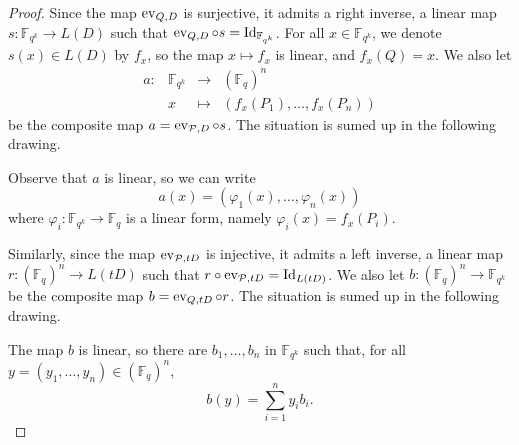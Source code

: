 \documentclass[11pt]{article}
\begin{document}
\begin{proof}
  Since the map $\operatorname{ev}_{Q, D}$ is surjective, it admits a right inverse, \ie a linear
  map $s: \mathbb{F}_{q^k} \to L(D)$
  such that
  $\operatorname{ev}_{Q, D}\circ s = \operatorname{Id}_{\mathbb{F}_{q^k}}$.
For all $x\in\mathbb{F}_{q^k}$, we denote $s(x)\in L(D)$ by $f_x$,
so the map $x\mapsto f_x$ is linear, and $f_x(Q)=x$. We
  also let
  \[
        \begin{array}{cccc}
          a: & \mathbb{F}_{q^k} & \to & (\mathbb{F}_{q})^n \\
          & x & \mapsto & (f_x(P_1), \dots, f_x(P_n))
\end{array}
  \]
  be the composite map $a = \operatorname{ev}_{\mathcal{P}, D}\circ s$. The situation is sumed up in the
  following drawing.
   \begin{center}
  \end{center}
Observe that $a$ is linear, so we can write
\[ a(x) = (\varphi_1(x), \dots, \varphi_n(x)) \]
where $\varphi_i:\mathbb{F}_{q^k}\to\mathbb{F}_{q}$ is a linear form, namely $\varphi_i(x)=f_x(P_i)$.



  Similarly, since the map $\operatorname{ev}_{\mathcal{P}, tD}$ is injective, it admits a left inverse, \ie a linear
  map $r: (\mathbb{F}_{q})^n \to L(tD)$
  such that $r\circ\operatorname{ev}_{\mathcal{P}, tD} = \operatorname{Id}_{L(tD)}$.
We also let $b: (\mathbb{F}_{q})^n \to \mathbb{F}_{q^k}$
  be the composite map $b = \operatorname{ev}_{Q, tD}\circ r$.   The situation is sumed up in the
  following drawing.
  \begin{center}
\end{center}
The map $b$ is linear, so there are $b_1, \dots, b_n$ in
  $\mathbb{F}_{q^k}$ such that, for all $y=(y_1, \dots, y_n)\in(\mathbb{F}_{q})^n$,
  \[
    b(y) = \sum_{i=1}^n y_i b_i.
  \]


\end{proof}
\end{document}
